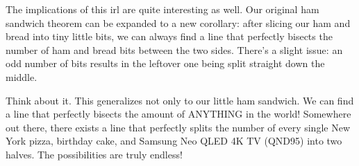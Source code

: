 \documentclass{article}
\begin{document}
The implications of this irl are quite interesting as well. Our original ham sandwich theorem can be expanded to a new corollary: after slicing our ham and bread into tiny little bits, we can always find a line that perfectly bisects the number of ham and bread bits between the two sides. There’s a slight issue: an odd number of bits results in the leftover one being split straight down the middle.

Think about it. This generalizes not only to our little ham sandwich. We can find a line that perfectly bisects the amount of ANYTHING in the world! Somewhere out there, there exists a line that perfectly splits the number of every single New York pizza, birthday cake, and Samsung Neo QLED 4K TV (QND95) into two halves. The possibilities are truly endless!
\end{document}
